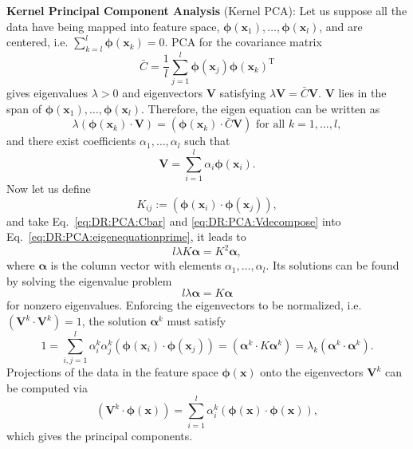 \textbf{Kernel Principal Component Analysis} (Kernel PCA): Let us suppose all the data have being mapped into feature space, $\boldsymbol{\phi}(\mathbf{x}_1),\dots,\boldsymbol{\phi}(\mathbf{x}_l)$, and are centered, i.e. $\sum_{k=l}^l \boldsymbol{\phi}(\mathbf{x}_k)=0$. PCA for the covariance matrix
\begin{equation}
	\bar{C}=\frac{1}{l}\sum_{j=1}^l \boldsymbol{\phi}(\mathbf{x}_j)\boldsymbol{\phi}(\mathbf{x}_k)^{\operatorname{T}}
	\label{eq:DR:PCA:Cbar}
\end{equation}
gives eigenvalues $\lambda >0$ and eigenvectors $\mathbf{V}$ satisfying $\lambda \mathbf{V}=\bar{C} \mathbf{V}$. $\mathbf{V}$ lies in the span of $\boldsymbol{\phi}(\mathbf{x}_1),\dots,\boldsymbol{\phi}(\mathbf{x}_l)$. Therefore, the eigen equation can be written as
\begin{equation}
	\lambda (\boldsymbol{\phi}(\mathbf{x}_k)\cdot \mathbf{V})=(\boldsymbol{\phi}(\mathbf{x}_k)\cdot \bar{C}\mathbf{V}) \text{ for all }k=1,\dots,l,
	\label{eq:DR:PCA:eigenequationprime}
\end{equation}
and there exist coefficients $\alpha_1,\dots,\alpha_l$ such that
\begin{equation}
	\mathbf{V}=\sum_{i=1}^l \alpha_i \boldsymbol{\phi}(\mathbf{x}_i).
	\label{eq:DR:PCA:Vdecompose}
\end{equation}
Now let us define
\begin{equation}
	K_{ij} :=(\boldsymbol{\phi}(\mathbf{x}_i)\cdot \boldsymbol{\phi}(\mathbf{x}_j)),
\end{equation}
and take Eq.~\ref{eq:DR:PCA:Cbar} and \ref{eq:DR:PCA:Vdecompose} into Eq.~\ref{eq:DR:PCA:eigenequationprime}, it leads to
\begin{equation}
	l\lambda K\boldsymbol{\alpha} =K^2\boldsymbol{\alpha},
\end{equation}
where $\boldsymbol{\alpha}$ is the column vector with elements $\alpha_1,\dots,\alpha_l$. Its solutions can be found by solving the eigenvalue problem
\begin{equation}
	l\lambda \boldsymbol{\alpha} =K\boldsymbol{\alpha}
\end{equation}
for nonzero eigenvalues. Enforcing the eigenvectors to be normalized, i.e. $(\mathbf{V}^k\cdot \mathbf{V}^k)=1$, the solution $\boldsymbol{\alpha}^k$ must satisfy
\begin{equation}
	1=\sum_{i,j=1}^l \alpha_i^k\alpha_j^k(\boldsymbol{\phi}(\mathbf{x}_i)\cdot \boldsymbol{\phi}(\mathbf{x}_j))=(\boldsymbol{\alpha}^k\cdot K\boldsymbol{\alpha}^k)=\lambda_k(\boldsymbol{\alpha}^k\cdot \boldsymbol{\alpha}^k).
\end{equation}
Projections of the data in the feature space $\boldsymbol{\phi}(\mathbf{x})$ onto the eigenvectors $\mathbf{V}^k$ can be computed via
\begin{equation}
	(\mathbf{V}^k\cdot \boldsymbol{\phi}(\mathbf{x}))=\sum_{i=1}^l\alpha_i^k(\boldsymbol{\phi}(\mathbf{x})\cdot \boldsymbol{\phi}(\mathbf{x})),
\end{equation}
which gives the principal components.


 